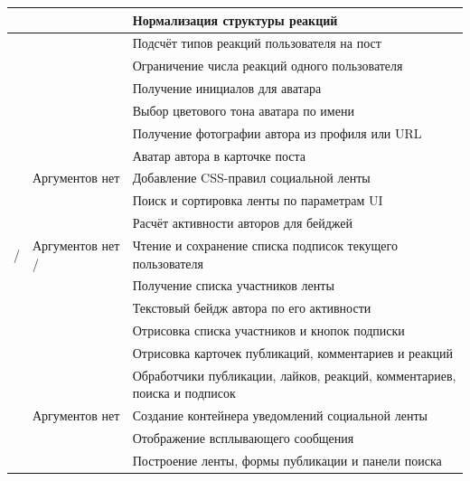 \begin{xltabular}{\textwidth}{|P{4.4cm}|P{3.4cm}|X|}
	 &  & Нормализация структуры реакций \\ \hline
	 &  & Подсчёт типов реакций пользователя на пост \\ \hline
	 &  & Ограничение числа реакций одного пользователя \\ \hline
	 &  & Получение инициалов для аватара \\ \hline
	 &  & Выбор цветового тона аватара по имени \\ \hline
	 &  & Получение фотографии автора из профиля или URL \\ \hline
	 &  & Аватар автора в карточке поста \\ \hline
	 & Аргументов нет & Добавление CSS-правил социальной ленты \\ \hline
	 &  & Поиск и сортировка ленты по параметрам UI \\ \hline
	 &  & Расчёт активности авторов для бейджей \\ \hline
	 /  & Аргументов нет /  & Чтение и сохранение списка подписок текущего пользователя \\ \hline
	 &  & Получение списка участников ленты \\ \hline
	 &  & Текстовый бейдж автора по его активности \\ \hline
	 &  & Отрисовка списка участников и кнопок подписки \\ \hline
	 &  & Отрисовка карточек публикаций, комментариев и реакций \\ \hline
	 &  & Обработчики публикации, лайков, реакций, комментариев, поиска и подписок \\ \hline
	 & Аргументов нет & Создание контейнера уведомлений социальной ленты \\ \hline
	 &  & Отображение всплывающего сообщения \\ \hline
	 &  & Построение ленты, формы публикации и панели поиска \\ \hline
\end{xltabular}

